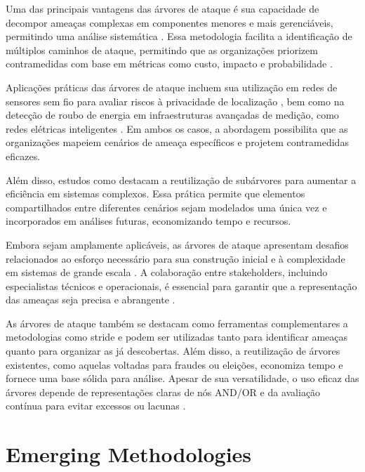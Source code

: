 Uma das principais vantagens das árvores de ataque é sua capacidade de
decompor ameaças complexas em componentes menores e mais gerenciáveis,
permitindo uma análise sistemática \cite{Energytheftdetectionissues}.
Essa metodologia facilita a identificação de múltiplos caminhos de
ataque, permitindo que as organizações priorizem contramedidas com
base em métricas como custo, impacto e probabilidade
\cite{AnAttackTreeBasedRisk}.

Aplicações práticas das árvores de ataque incluem sua utilização em
redes de sensores sem fio para avaliar riscos à privacidade de
localização \cite{AnAttackTreeBasedRisk}, bem como na detecção de
roubo de energia em infraestruturas avançadas de medição, como redes
elétricas inteligentes \cite{Energytheftdetectionissues}. Em ambos os
casos, a abordagem possibilita que as organizações mapeiem cenários de
ameaça específicos e projetem contramedidas eficazes.

Além disso, estudos como \cite{FoundationsofAttackTrees} destacam a
reutilização de subárvores para aumentar a eficiência em sistemas
complexos. Essa prática permite que elementos compartilhados entre
diferentes cenários sejam modelados uma única vez e incorporados em
análises futuras, economizando tempo e recursos.

Embora sejam amplamente aplicáveis, as árvores de ataque apresentam
desafios relacionados ao esforço necessário para sua construção
inicial e à complexidade em sistemas de grande escala
\cite{AttackTrees}. A colaboração entre stakeholders, incluindo
especialistas técnicos e operacionais, é essencial para garantir que a
representação das ameaças seja precisa e abrangente
\cite{Energytheftdetectionissues}.

As árvores de ataque também se destacam como ferramentas
complementares a metodologias como \gls{stride} e podem ser utilizadas tanto
para identificar ameaças quanto para organizar as já descobertas. Além
disso, a reutilização de árvores existentes, como aquelas voltadas
para fraudes ou eleições, economiza tempo e fornece uma base sólida
para análise. Apesar de sua versatilidade, o uso eficaz das árvores
depende de representações claras de nós AND/OR e da avaliação contínua
para evitar excessos ou lacunas \cite{ThreatModelingdesigningForSecurity}.

\section{Emerging Methodologies}
\label{sec:emerging_methodologies}

